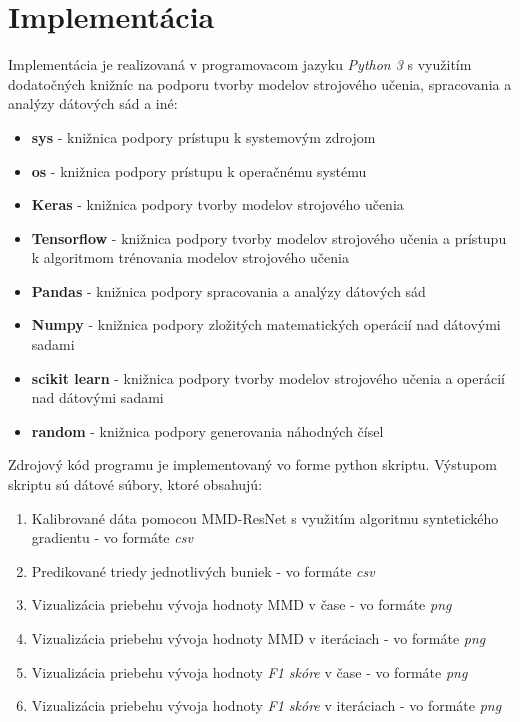 \chapter{Implementácia}  %

Implementácia je realizovaná v programovacom jazyku \textit{Python 3} s využitím dodatočných knižníc na podporu tvorby modelov strojového učenia, spracovania a analýzy dátových sád a iné:
\begin{itemize}
    \item \textbf{sys} - knižnica podpory prístupu k systemovým zdrojom
    \item \textbf{os} -  knižnica podpory prístupu k operačnému systému
    \item \textbf{Keras} - knižnica podpory tvorby modelov strojového učenia
    \item \textbf{Tensorflow} - knižnica podpory tvorby modelov strojového učenia a prístupu k algoritmom trénovania modelov strojového učenia
    \item \textbf{Pandas} - knižnica podpory spracovania a analýzy dátových sád
    \item \textbf{Numpy} - knižnica podpory zložitých matematických operácií nad dátovými sadami
    \item \textbf{scikit learn} - knižnica podpory tvorby modelov strojového učenia a operácií nad dátovými sadami
    \item \textbf{random} - knižnica podpory generovania náhodných čísel
\end{itemize}

Zdrojový kód programu je implementovaný vo forme python skriptu. Výstupom skriptu sú dátové súbory, ktoré obsahujú:
\begin{enumerate}
    \item Kalibrované dáta pomocou MMD-ResNet s využitím algoritmu syntetického gradientu - vo formáte \textit{csv}
    \item Predikované triedy jednotlivých buniek - vo formáte \textit{csv}
    \item Vizualizácia priebehu vývoja hodnoty MMD v čase - vo formáte \textit{png}
    \item Vizualizácia priebehu vývoja hodnoty MMD v iteráciach - vo formáte \textit{png}
    \item Vizualizácia priebehu vývoja hodnoty \textit{F1 skóre} v čase - vo formáte \textit{png}
    \item Vizualizácia priebehu vývoja hodnoty \textit{F1 skóre} v iteráciach - vo formáte \textit{png}
\end{enumerate}


